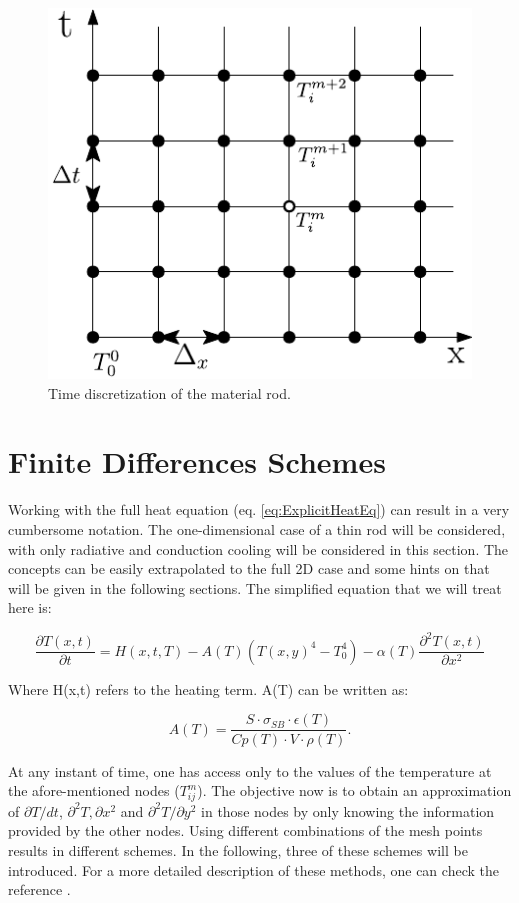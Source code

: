 \begin{figure}[h]
    \centering
    \includegraphics[width=0.4\columnwidth]{TimeDiscretization/TimeDiscret.pdf}
    \caption{Time discretization of the material rod.}
    \label{fig:TimeDiscret}
\end{figure}

\section{Finite Differences Schemes}
\label{sec:FD}

Working with the full heat equation (eq. \ref{eq:ExplicitHeatEq}) can result in a very cumbersome notation. 
The one-dimensional case of a thin rod will be considered, with only radiative and conduction cooling will be considered in this section. The concepts can be easily extrapolated to the full 2D case and some hints on that will be given in the following sections.  The simplified equation that we will treat here is: 

\begin{equation}
    \frac{\partial T(x,t)}{\partial t} = 
        H(x,t,T)
        - A(T) \left(T(x,y)^4 - T_0^4\right)
            -\alpha (T)  \frac{\partial^2 T(x,t)}{\partial x^2}   
            \label{eq:SimpleHeating}
    \end{equation}

Where H(x,t) refers to the heating term. A(T) can be written as: 

\begin{equation}
    A(T) = \frac{S\cdot \sigma_{SB}\cdot \epsilon(T)}{Cp(T)\cdot V \cdot \rho(T)}. 
\end{equation}

At any instant of time, one has access only to the values of the temperature at the afore-mentioned nodes ($T^{m}_{ij}$). The objective now is to obtain an approximation of $\partial T/dt$, $\partial^2 T,\partial x^2$ and $\partial^2 T/\partial y^2$ in those nodes by only knowing the information provided by the other nodes. Using different combinations of the mesh points results in different schemes. In the following, three of these schemes will be introduced. For a more detailed description of these methods, one can check the reference \parencite[][]{ref:FiniteDifference}.

